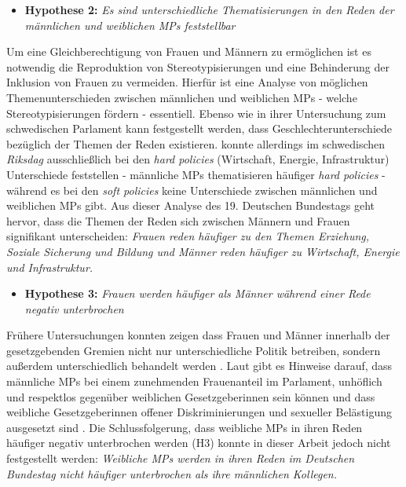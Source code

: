 \documentclass[12pt, 
    twoside=false, 
    bibliography=totoc, 
    numbers=endperiod, 
    headings=normal, 
    toc=chapterentrydotfill
    ]{scrbook}
\begin{document}
\begin{itemize}
    \item \textbf{Hypothese 2:} \emph{Es sind unterschiedliche Thematisierungen in den Reden der männlichen und weiblichen MPs feststellbar}
   \end{itemize}
    
Um eine Gleichberechtigung von Frauen und Männern zu ermöglichen ist es notwendig die Reproduktion von Stereotypisierungen und eine Behinderung der Inklusion von Frauen zu vermeiden. Hierfür ist eine Analyse von möglichen Themenunterschieden zwischen männlichen und weiblichen MPs - welche Stereotypisierungen fördern - essentiell. 
Ebenso wie \textcite{back_2014} in ihrer Untersuchung zum schwedischen Parlament kann festgestellt werden, dass Geschlechterunterschiede bezüglich der Themen der Reden existieren. \textcite{back_2014} konnte allerdings im schwedischen \emph{Riksdag} ausschließlich bei den \emph{hard policies} (Wirtschaft, Energie, Infrastruktur) Unterschiede feststellen - männliche MPs thematisieren häufiger \emph{hard policies} -  während es bei den \emph{soft policies} keine Unterschiede zwischen männlichen und weiblichen MPs gibt. Aus dieser Analyse des 19. Deutschen Bundestags geht hervor, dass die Themen der Reden sich zwischen Männern und Frauen signifikant unterscheiden: \emph{Frauen reden häufiger zu den Themen Erziehung, Soziale Sicherung und Bildung und Männer reden häufiger zu Wirtschaft, Energie und Infrastruktur.} 


\begin{itemize}
    \item \textbf{Hypothese 3:} \emph{Frauen werden häufiger als Männer während einer Rede negativ unterbrochen}
     \end{itemize}

Frühere Untersuchungen konnten zeigen dass Frauen und Männer innerhalb der gesetzgebenden Gremien nicht nur unterschiedliche Politik betreiben, sondern außerdem unterschiedlich behandelt werden \parencites[201]{erikson_2018}{childs_2004}. Laut \textcite{kathlene_1994} gibt es Hinweise darauf, dass männliche MPs bei einem zunehmenden Frauenanteil im Parlament, unhöflich und respektlos gegenüber weiblichen Gesetzgeberinnen sein können \parencites[201]{erikson_2018} und dass weibliche Gesetzgeberinnen offener Diskriminierungen und sexueller Belästigung ausgesetzt sind \parencites[201]{erikson_2018}[76]{lovenduski_2005}{lovenduski_2004}. Die Schlussfolgerung, dass weibliche MPs in ihren Reden häufiger negativ unterbrochen werden (H3) konnte in dieser Arbeit jedoch nicht festgestellt werden: \emph{Weibliche MPs werden in ihren Reden im Deutschen Bundestag nicht häufiger unterbrochen als ihre männlichen Kollegen.} 
\end{document}
